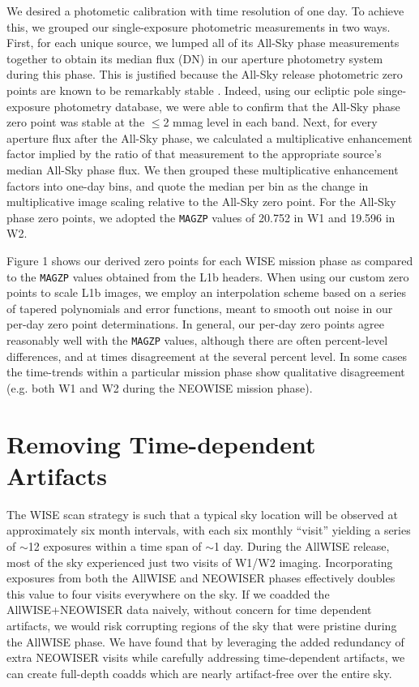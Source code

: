 \documentclass{emulateapj}
\begin{document}
We desired a photometic calibration with time resolution of one day. To
achieve this, we grouped our single-exposure photometric measurements in two 
ways. First, for each 
unique source, we lumped all of its All-Sky phase measurements together to 
obtain its median flux (DN) in our aperture photometry system during this 
phase. This is justified because the All-Sky release photometric zero points 
are known to be remarkably stable \citep{jarrett11}. Indeed, using our ecliptic
pole singe-exposure photometry database, we were able to confirm that the 
All-Sky phase zero point was stable at the $\le$2 mmag level in each band. 
Next, for every aperture flux after the All-Sky phase, we calculated a 
multiplicative enhancement factor
implied by the ratio of that measurement to the appropriate source's
median All-Sky phase flux. We then grouped these 
multiplicative enhancement factors into one-day bins, and quote the median per 
bin as the change in multiplicative
image scaling relative to the All-Sky zero point. For the  
All-Sky phase zero points, we adopted the \verb|MAGZP| values of 20.752 in W1 
and 19.596 in W2.

Figure 1 shows our derived zero points for each WISE mission phase as 
compared to the \verb|MAGZP| values obtained from the L1b headers. When
using our custom zero points to scale L1b images, we employ an 
interpolation scheme based on a series of tapered polynomials and 
error functions, meant to smooth out noise in our per-day zero point
determinations. In general, our per-day zero points agree reasonably
well with the \verb|MAGZP| values, although there are often 
percent-level differences, and at times disagreement at the several percent
level. In some cases the time-trends within a particular mission phase
show qualitative disagreement (e.g. both W1 and W2 during the NEOWISE
mission phase).



\section{Removing Time-dependent Artifacts}
\label{sec:moon}

The WISE scan strategy is such that a typical sky location will be 
observed at approximately six month intervals, with each six monthly
``visit'' yielding a series of $\sim$12 exposures within a time span of $\sim$1
day. During the AllWISE release, most of the sky experienced just two visits
of W1/W2 imaging. Incorporating exposures from both the AllWISE and
NEOWISER phases effectively doubles this value to four visits everywhere
on the sky. If we coadded the AllWISE+NEOWISER data naively, without
concern for time dependent artifacts, we would risk corrupting regions of the 
sky that were pristine during the AllWISE phase. We have found that by 
leveraging the added redundancy of extra NEOWISER visits while carefully 
addressing time-dependent artifacts, we can create full-depth coadds which are 
nearly artifact-free over the entire sky.
\end{document}
